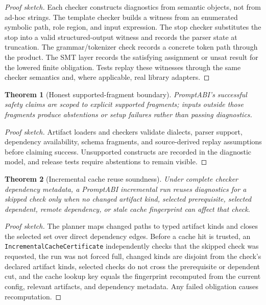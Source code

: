 \documentclass[10pt]{article}
\newtheorem{theorem}{Theorem}
\begin{document}
\begin{proof}[Proof sketch]
Each checker constructs diagnostics from semantic objects, not from ad-hoc
strings. The template checker builds a witness from an enumerated symbolic path,
role region, and input expression. The stop checker substitutes the stop into a
valid structured-output witness and records the parser state at truncation. The
grammar/tokenizer check records a concrete token path through the product. The
SMT layer records the satisfying assignment or unsat result for the lowered
finite obligation. Tests replay these witnesses through the same checker
semantics and, where applicable, real library adapters.
\end{proof}

\begin{theorem}[Honest supported-fragment boundary]
PromptABI's successful safety claims are scoped to explicit supported fragments;
inputs outside those fragments produce abstentions or setup failures rather than
passing diagnostics.
\end{theorem}

\begin{proof}[Proof sketch]
Artifact loaders and checkers validate dialects, parser support, dependency
availability, schema fragments, and source-derived replay assumptions before
claiming success. Unsupported constructs are recorded in the diagnostic model,
and release tests require abstentions to remain visible.
\end{proof}

\begin{theorem}[Incremental cache reuse soundness]
Under complete checker dependency metadata, a PromptABI incremental run reuses
diagnostics for a skipped check only when no changed artifact kind, selected
prerequisite, selected dependent, remote dependency, or stale cache fingerprint
can affect that check.
\end{theorem}

\begin{proof}[Proof sketch]
The planner maps changed paths to typed artifact kinds and closes the selected
set over direct dependency edges. Before a cache hit is trusted, an
\texttt{IncrementalCacheCertificate} independently checks that the skipped check
was requested, the run was not forced full, changed kinds are disjoint from the
check's declared artifact kinds, selected checks do not cross the prerequisite or
dependent cut, and the cache lookup key equals the fingerprint recomputed from
the current config, relevant artifacts, and dependency metadata. Any failed
obligation causes recomputation.
\end{proof}
\end{document}
